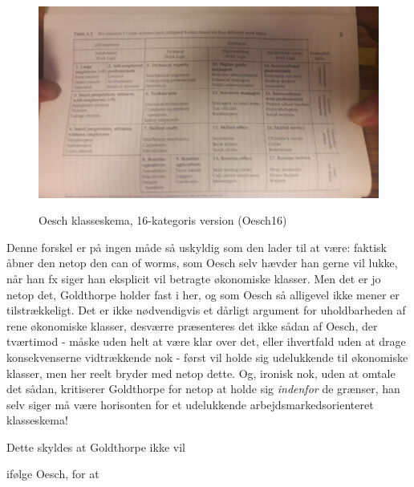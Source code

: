 %
   \begin{figure}[H]
   \begin{centering}
   	\caption{Oesch klasseskema, 16-kategoris version (Oesch16)}
   	\includegraphics[width=\textwidth]{fig/oesch16_klasseskema.jpg}
   	\label{fig oesch16}
   \end{centering}
   \end{figure}   
%









 Denne forskel er på ingen måde så uskyldig som den lader til at være: faktisk åbner den netop den can of worms, som Oesch selv hævder han gerne vil lukke, når han fx siger han eksplicit vil betragte økonomiske klasser. Men det er jo netop det, Goldthorpe holder fast i her, og som Oesch så alligevel ikke mener er tilstrækkeligt. Det er ikke nødvendigvis et dårligt argument for uholdbarheden af rene økonomiske klasser, desværre præsenteres det ikke sådan af Oesch, der tværtimod - måske uden helt at være klar over det, eller ihvertfald uden at drage konsekvenserne vidtrækkende nok - først vil holde sig udelukkende til økonomiske klasser, men her reelt bryder med netop dette. Og, ironisk nok, uden at omtale det sådan, kritiserer Goldthorpe for netop at holde sig \emph{indenfor} de grænser, han selv siger må være horisonten for et udelukkende arbejdsmarkedsorienteret klasseskema! 






 Dette skyldes at Goldthorpe ikke vil 


ifølge Oesch, for at 



